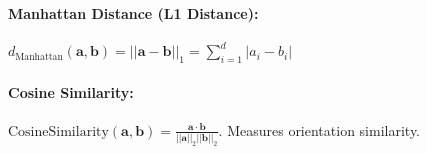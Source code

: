 \begin{appendices}
  \paragraph{Manhattan Distance (L1 Distance):}
  \( d_{\text{Manhattan}}(\bm{a}, \bm{b}) = ||\bm{a} - \bm{b}||_1 = \sum_{i=1}^d |a_i - b_i| \)

  \paragraph{Cosine Similarity:}
  \( \text{CosineSimilarity}(\bm{a}, \bm{b}) = \frac{\bm{a} \cdot \bm{b}}{||\bm{a}||_2 ||\bm{b}||_2} \). Measures orientation similarity.

\end{appendices}